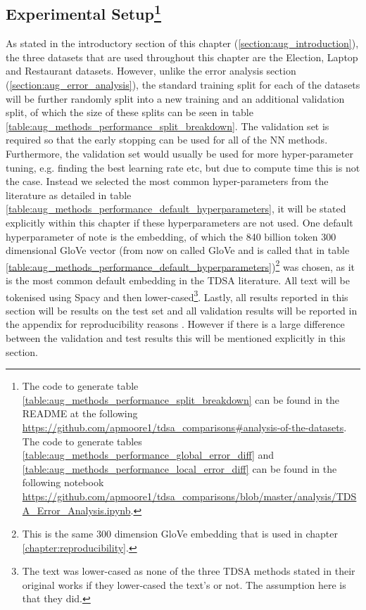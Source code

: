 \subsection[Experimental Setup]{Experimental Setup\footnote{The code to generate table \ref{table:aug_methods_performance_split_breakdown} can be found in the README at the following \url{https://github.com/apmoore1/tdsa_comparisons\#analysis-of-the-datasets}. The code to generate tables \ref{table:aug_methods_performance_global_error_diff} and \ref{table:aug_methods_performance_local_error_diff} can be found in the following notebook \url{https://github.com/apmoore1/tdsa_comparisons/blob/master/analysis/TDSA_Error_Analysis.ipynb}.}}
\label{section:aug_experimental_setup}
As stated in the introductory section of this chapter (\ref{section:aug_introduction}), the three datasets that are used throughout this chapter are the Election, Laptop and Restaurant datasets. However, unlike the error analysis section (\ref{section:aug_error_analysis}), the standard training split for each of the datasets will be further randomly split into a new training and an additional validation split, of which the size of these splits can be seen in table \ref{table:aug_methods_performance_split_breakdown}. The validation set is required so that the early stopping can be used for all of the NN methods. Furthermore, the validation set would usually be used for more hyper-parameter tuning, e.g. finding the best learning rate etc, but due to compute time this is not the case. Instead we selected the most common hyper-parameters from the literature as detailed in table \ref{table:aug_methods_performance_default_hyperparameters}, it will be stated explicitly within this chapter if these hyperparameters are not used. One default hyperparameter of note is the embedding, of which the 840 billion token 300 dimensional GloVe vector \citep{pennington-etal-2014-glove} (from now on called GloVe and is called that in table \ref{table:aug_methods_performance_default_hyperparameters})\footnote{This is the same 300 dimension GloVe embedding that is used in chapter \ref{chapter:reproducibility}.} was chosen, as it is the most common default embedding in the TDSA literature. All text will be tokenised using Spacy and then lower-cased\footnote{The text was lower-cased as none of the three TDSA methods stated in their original works if they lower-cased the text's or not. The assumption here is that they did.}. Lastly, all results reported in this section will be results on the test set and all validation results will be reported in the appendix for reproducibility reasons \citep{dodge-etal-2019-show}. However if there is a large difference between the validation and test results this will be mentioned explicitly in this section.

